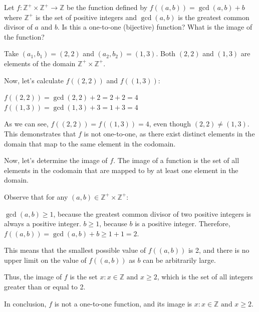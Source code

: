 \begin{exercise}
	Let $f:\mathbb{Z}^+\times\mathbb{Z}^+\to\mathbb{Z}$ be the function defined by $f((a,b))=\gcd(a,b)+b$ where $\mathbb{Z}^+$ is the set of positive integers and $\gcd(a,b)$ is the greatest common divisor of $a$ and $b$.
	Is this a one-to-one (bijective) function? What is the image of the function?
\end{exercise}
\begin{solution}
	Take $(a_1, b_1) = (2, 2)$ and $(a_2, b_2) = (1, 3)$. Both $(2, 2)$ and $(1, 3)$ are elements of the domain $\mathbb{Z}^+ \times \mathbb{Z}^+$.
	
	Now, let's calculate $f((2, 2))$ and $f((1, 3))$:
	
	$f((2, 2)) = \gcd(2, 2) + 2 = 2 + 2 = 4$
	$f((1, 3)) = \gcd(1, 3) + 3 = 1 + 3 = 4$
	
	As we can see, $f((2, 2)) = f((1, 3)) = 4$, even though $(2, 2) \neq (1, 3)$. This demonstrates that $f$ is not one-to-one, as there exist distinct elements in the domain that map to the same element in the codomain.
	
	Now, let's determine the image of $f$. The image of a function is the set of all elements in the codomain that are mapped to by at least one element in the domain.
	
	Observe that for any $(a, b) \in \mathbb{Z}^+ \times \mathbb{Z}^+$:
	
	$\gcd(a, b) \geq 1$, because the greatest common divisor of two positive integers is always a positive integer.
	$b \geq 1$, because $b$ is a positive integer.
	Therefore, $f((a, b)) = \gcd(a, b) + b \geq 1 + 1 = 2$.
	
	This means that the smallest possible value of $f((a, b))$ is 2, and there is no upper limit on the value of $f((a, b))$ as $b$ can be arbitrarily large.
	
	Thus, the image of $f$ is the set ${x : x \in \mathbb{Z} \text{ and } x \geq 2}$, which is the set of all integers greater than or equal to 2.
	
	In conclusion, $f$ is not a one-to-one function, and its image is ${x : x \in \mathbb{Z} \text{ and } x \geq 2}$.
\end{solution}

